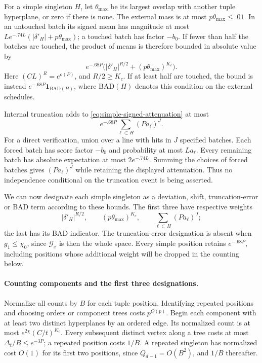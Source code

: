 For a simple singleton \(H\), let \(\theta_{\max}\) be its largest overlap
with another tuple hyperplane, or zero if there is none.  The external
mass is at most \(p\theta_{\max}\le .01\).  In an untouched batch its
signed mean has magnitude at most
\(Le^{-.74L}(|\delta'_H|+p\theta_{\max})\); a touched batch has factor
\(-b_0\).  If fewer than half the batches are touched, the product of
means is therefore bounded in absolute value by
\begin{equation}
 e^{-.68P}\bigl(|\delta'_H|^{R/2}+
                         (p\theta_{\max})^{K_c}\bigr).
 \label{eq:simple-signed-attenuation}
\end{equation}
Here \((CL)^R=e^{o(P)}\), and \(R/2\ge K_c\).
If at least half are touched, the bound is instead
\(e^{-.68P}\mathbf1_{\mathrm{BAD}(H)}\), where
\(\mathrm{BAD}(H)\) denotes this condition on the external schedules.

Internal truncation adds to \eqref{eq:simple-signed-attenuation} at most
\begin{equation}
 e^{-.68P}\sum_{\ell\subset H}(Pa_\ell)^J.
 \label{eq:truncation-error}
\end{equation}
For a direct verification, union over a line with hits in \(J\) specified
batches.  Each forced batch has score factor \(-b_0\) and probability at
most \(La_\ell\).  Every remaining batch has absolute expectation at
most \(2e^{-.74L}\).  Summing the choices of forced batches gives
\((Pa_\ell)^J\) while retaining the displayed attenuation.  Thus no
independence conditional on the truncation event is being asserted.

We can now designate each simple singleton as a deviation, shift,
truncation-error or BAD term according to these bounds.  The first three
have respective weights
\[
 |\delta'_H|^{R/2},\qquad (p\theta_{\max})^{K_c},\qquad
 \sum_{\ell\subset H}(Pa_\ell)^J;
\]
the last has its BAD indicator.  The truncation-error designation is absent
when \(g_1\le\chi_0\), since \(\mathcal G_x\) is then the whole space.
Every simple position retains
\(e^{-.68P}\), including positions whose additional weight will be
dropped in the counting below.

\paragraph{Counting components and the first three designations.}
Normalize all counts by \(B\) for each tuple position.
Identifying repeated positions and choosing orders or component trees
costs \(p^{O(p)}\).  Begin each component with at least two distinct
hyperplanes by an ordered edge.  Its normalized count is at most
\(e^{2\chi}(C/t)^{K_c}\).  Every subsequent distinct vertex along a tree
costs at most \(\Delta_t/B\le e^{-3P}\); a repeated position costs
\(1/B\).  A repeated singleton has normalized cost \(O(1)\) for its
first two positions, since \(Q_{d-1}=O(B^2)\), and \(1/B\) thereafter.

